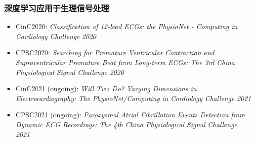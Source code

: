 \begin{frame}
{\begin{figure}
\end{figure}
}


\end{frame}


\begin{frame}
\frametitle{深度学习应用于生理信号处理}

\begin{itemize}
\item<1-> CinC2020: \textit{\scriptsize Classification of 12-lead ECGs: the PhysioNet - Computing in Cardiology Challenge 2020}
\item<1-> {\color{red} CPSC2020}: \textit{\scriptsize Searching for Premature Ventricular Contraction and Supraventricular Premature Beat from Long-term ECGs: The 3rd China Physiological Signal Challenge 2020}


\item<1-> CinC2021 {\scriptsize (ongoing)}: \textit{\scriptsize Will Two Do? Varying Dimensions in Electrocardiography: The PhysioNet/Computing in Cardiology Challenge 2021}
\item<1-> CPSC2021 {\scriptsize (ongoing)}: \textit{\scriptsize Paroxysmal Atrial Fibrillation Events Detection from Dynamic ECG Recordings: The 4th China Physiological Signal Challenge 2021}
\end{itemize}

\end{frame}



